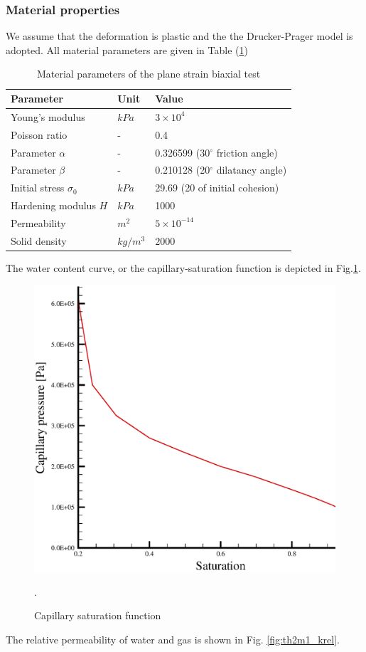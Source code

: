 \subsubsection*{Material properties}
We assume that the deformation is plastic and the the Drucker-Prager model is adopted. All material parameters are given in Table (\ref{tab:th2m1})
 \begin{table}[H]
\centering
\begin{tabular}{lll}
\hline \hline
Parameter   &  Unit  & Value\\
\hline
  Young's modulus &  $kPa$ &  $3\times10^4$ \\
\hline\hline
  Poisson ratio & - &  0.4 \\
\hline
  Parameter $\alpha$  & - & 0.326599   (30$^\circ$ friction angle)\\
\hline
  Parameter $\beta$  & - &  0.210128  (20$^\circ$ dilatancy angle)\\
\hline
  Initial stress $\sigma_0$ & $kPa$ &  29.69 (20 of initial cohesion)\\
\hline
  Hardening modulus $H$ & $kPa$ &  1000\\
\hline
  Permeability  & $m^2$ &  $5\times10^{-14}$\\
\hline
 Solid density  & $kg/m^3$ &  $2000$\\
\hline \hline
\end{tabular}
\caption{Material parameters of the plane strain biaxial test}
\label{tab:th2m1}
\end{table}
The water content curve, or the capillary-saturation function is depicted in Fig.\ref{fig:th2m_pcs}.
\begin{figure}[!thb]
\begin{center}
\includegraphics[scale=0.3]{TH2M/figure/pcs.eps}
\end{center}
\caption{Capillary saturation function}.
 \label{fig:th2m_pcs}
\end{figure}
The relative permeability of water and gas is shown in Fig. \ref{fig:th2m1_krel}.

